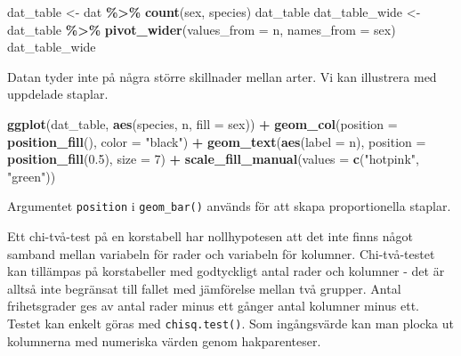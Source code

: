 \documentclass[
]{book}
\newenvironment{Shaded}{\begin{snugshade}}{\end{snugshade}}
\newcommand{\AttributeTok}[1]{\textcolor[rgb]{0.13,0.29,0.53}{#1}}
\newcommand{\DecValTok}[1]{\textcolor[rgb]{0.00,0.00,0.81}{#1}}
\newcommand{\FloatTok}[1]{\textcolor[rgb]{0.00,0.00,0.81}{#1}}
\newcommand{\FunctionTok}[1]{\textcolor[rgb]{0.13,0.29,0.53}{\textbf{#1}}}
\newcommand{\NormalTok}[1]{#1}
\newcommand{\OtherTok}[1]{\textcolor[rgb]{0.56,0.35,0.01}{#1}}
\newcommand{\SpecialCharTok}[1]{\textcolor[rgb]{0.81,0.36,0.00}{\textbf{#1}}}
\newcommand{\StringTok}[1]{\textcolor[rgb]{0.31,0.60,0.02}{#1}}
\theoremstyle{definition}
\theoremstyle{definition}
\theoremstyle{definition}
\theoremstyle{definition}
\theoremstyle{remark}
\begin{document}
\begin{Shaded}
\begin{Highlighting}[]
\NormalTok{dat\_table }\OtherTok{\textless{}{-}}\NormalTok{ dat }\SpecialCharTok{\%\textgreater{}\%} \FunctionTok{count}\NormalTok{(sex, species)}
\NormalTok{dat\_table}
\NormalTok{dat\_table\_wide }\OtherTok{\textless{}{-}}\NormalTok{ dat\_table }\SpecialCharTok{\%\textgreater{}\%} 
  \FunctionTok{pivot\_wider}\NormalTok{(}\AttributeTok{values\_from =}\NormalTok{ n, }\AttributeTok{names\_from =}\NormalTok{ sex)}
\NormalTok{dat\_table\_wide}
\end{Highlighting}
\end{Shaded}

Datan tyder inte på några större skillnader mellan arter. Vi kan illustrera med uppdelade staplar.

\begin{Shaded}
\begin{Highlighting}[]
\FunctionTok{ggplot}\NormalTok{(dat\_table, }\FunctionTok{aes}\NormalTok{(species, n, }\AttributeTok{fill =}\NormalTok{ sex)) }\SpecialCharTok{+}
  \FunctionTok{geom\_col}\NormalTok{(}\AttributeTok{position =} \FunctionTok{position\_fill}\NormalTok{(), }\AttributeTok{color =} \StringTok{"black"}\NormalTok{) }\SpecialCharTok{+}
  \FunctionTok{geom\_text}\NormalTok{(}\FunctionTok{aes}\NormalTok{(}\AttributeTok{label =}\NormalTok{ n), }\AttributeTok{position =} \FunctionTok{position\_fill}\NormalTok{(}\FloatTok{0.5}\NormalTok{), }\AttributeTok{size =} \DecValTok{7}\NormalTok{) }\SpecialCharTok{+}
  \FunctionTok{scale\_fill\_manual}\NormalTok{(}\AttributeTok{values =} \FunctionTok{c}\NormalTok{(}\StringTok{"hotpink"}\NormalTok{, }\StringTok{"green"}\NormalTok{))}
\end{Highlighting}
\end{Shaded}

Argumentet \texttt{position} i \texttt{geom\_bar()} används för att skapa proportionella staplar.

Ett chi-två-test på en korstabell har nollhypotesen att det inte finns något samband mellan variabeln för rader och variabeln för kolumner. Chi-två-testet kan tillämpas på korstabeller med godtyckligt antal rader och kolumner - det är alltså inte begränsat till fallet med jämförelse mellan två grupper. Antal frihetsgrader ges av antal rader minus ett gånger antal kolumner minus ett. Testet kan enkelt göras med \texttt{chisq.test()}. Som ingångsvärde kan man plocka ut kolumnerna med numeriska värden genom hakparenteser.
\end{document}
